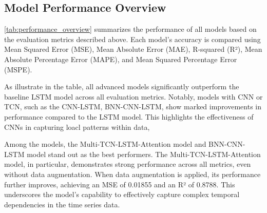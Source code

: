 \documentclass[final-report]{report-template}
\begin{document}
\subsection{Model Performance Overview}
\autoref{tab:performance_overview} summarizes the performance of all models based on the evaluation metrics described above. Each model's accuracy is compared using Mean Squared Error (MSE), Mean Absolute Error (MAE), R-squared (R²), Mean Absolute Percentage Error (MAPE), and Mean Squared Percentage Error (MSPE).
\begin{table}[h]
\centering
\caption{Performance Overview of Different Models 5days}
\label{tab:performance_overview}
\end{table}

As illustrate in the table, all advanced models significantly outperform the baseline LSTM model across all evaluation metrics. Notably, models with CNN or TCN, such as the CNN-LSTM, BNN-CNN-LSTM, show marked improvements in performance compared to the LSTM model. This highlights the effectiveness of CNNs in capturing loacl patterns within data, 

Among the models, the Multi-TCN-LSTM-Attention model and BNN-CNN-LSTM model stand out as the best performers. The Multi-TCN-LSTM-Attention model, in particular, demonstrates strong performance across all metrics, even without data augmentation. When data augmentation is applied, its performance further improves, achieving an MSE of 0.01855 and an R² of 0.8788. This underscores the model's capability to effectively capture complex temporal dependencies in the time series data. 
\end{document}
